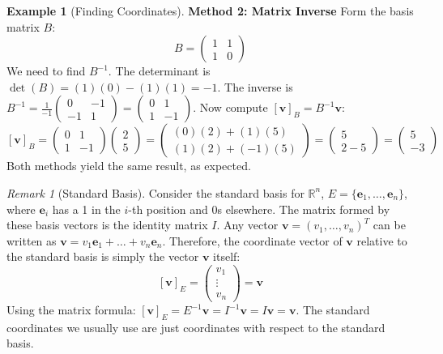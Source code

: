 \documentclass[11pt]{article}
\theoremstyle{definition}
\newtheorem{example}[theorem]{Example}
\theoremstyle{remark}
\newtheorem{remark}[theorem]{Remark}
\begin{document}
\begin{example}[Finding Coordinates]
\textbf{Method 2: Matrix Inverse}
Form the basis matrix $B$:
\[ B = \begin{pmatrix} 1 & 1 \\ 1 & 0 \end{pmatrix} \]
We need to find $B^{-1}$. The determinant is $\det(B) = (1)(0) - (1)(1) = -1$.
The inverse is $B^{-1} = \frac{1}{-1} \begin{pmatrix} 0 & -1 \\ -1 & 1 \end{pmatrix} = \begin{pmatrix} 0 & 1 \\ 1 & -1 \end{pmatrix}$.
Now compute $[\mathbf{v}]_B = B^{-1} \mathbf{v}$:
\[ [\mathbf{v}]_B = \begin{pmatrix} 0 & 1 \\ 1 & -1 \end{pmatrix} \begin{pmatrix} 2 \\ 5 \end{pmatrix} = \begin{pmatrix} (0)(2) + (1)(5) \\ (1)(2) + (-1)(5) \end{pmatrix} = \begin{pmatrix} 5 \\ 2 - 5 \end{pmatrix} = \begin{pmatrix} 5 \\ -3 \end{pmatrix} \]
Both methods yield the same result, as expected.
\end{example}

\begin{remark}[Standard Basis]
Consider the standard basis for $\mathbb{R}^n$, $E = \{\mathbf{e}_1, \dots, \mathbf{e}_n\}$, where $\mathbf{e}_i$ has a 1 in the $i$-th position and 0s elsewhere. The matrix formed by these basis vectors is the identity matrix $I$.
Any vector $\mathbf{v} = (v_1, \dots, v_n)^T$ can be written as $\mathbf{v} = v_1 \mathbf{e}_1 + \dots + v_n \mathbf{e}_n$.
Therefore, the coordinate vector of $\mathbf{v}$ relative to the standard basis is simply the vector $\mathbf{v}$ itself:
\[ [\mathbf{v}]_E = \begin{pmatrix} v_1 \\ \vdots \\ v_n \end{pmatrix} = \mathbf{v} \]
Using the matrix formula: $[\mathbf{v}]_E = E^{-1} \mathbf{v} = I^{-1} \mathbf{v} = I \mathbf{v} = \mathbf{v}$.
The standard coordinates we usually use are just coordinates with respect to the standard basis.
\end{remark}
\end{document}
